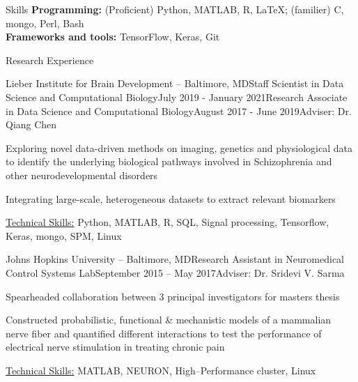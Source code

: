 \documentclass{resume}
\begin{document}
    \begin{rSection}{Skills}
\textbf{Programming:} (Proficient) Python, MATLAB, R, \LaTeX; (familier) C, mongo, Perl, Bash \\
\textbf{Frameworks and tools:} TensorFlow, Keras, Git
\end{rSection} 
  \begin{rSection}{Research Experience}
\begin{rSubsectionPromotion}{Lieber Institute for Brain Development -- Baltimore, MD}{}{Staff Scientist in Data Science and Computational Biology}{July 2019 - January 2021}{Research Associate in Data Science and Computational Biology}{August 2017 - June 2019}{Adviser: Dr. Qiang Chen}
\item Exploring novel data-driven methods on imaging, genetics and physiological data to identify the underlying biological pathways involved in Schizophrenia and other neurodevelopmental disorders
\item Integrating large-scale, heterogeneous datasets to extract relevant biomarkers
\item \uline{Technical Skills:} Python, MATLAB, R, SQL, Signal processing, Tensorflow, Keras, mongo, SPM, Linux
    \end{rSubsectionPromotion}

    \begin{rSubsection}{Johns Hopkins University -- Baltimore, MD}{}{Research Assistant in Neuromedical Control Systems Lab}{September 2015 -- May 2017}{Adviser: Dr. Sridevi V. Sarma}
\item Spearheaded collaboration between 3 principal investigators for masters thesis
\item Constructed probabilistic, functional \& mechanistic models of a mammalian nerve fiber and quantified different interactions to test the performance of electrical nerve stimulation in treating chronic pain
\item \uline{Technical Skills:} MATLAB, NEURON, High--Performance cluster, Linux
    \end{rSubsection}
  

\end{rSection}
\end{document}
